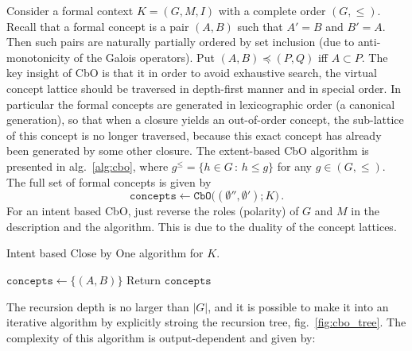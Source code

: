 \documentclass[a4paper,14pt]{extarticle}
\begin{document}
\noindent Consider a formal context $K=(G, M, I)$ with a complete order
$(G, \leq)$. Recall that a formal concept is a pair $(A, B)$ such that $A'=B$ and
$B'=A$. Then such pairs are naturally partially ordered by set inclusion (due to
anti-monotonicity of the Galois operators). Put $(A, B) \preceq (P, Q)$ iff $A\subset P$.
The key insight of CbO is that it in order to avoid exhaustive search, the virtual
concept lattice should be traversed in depth-first manner and in special order. In
particular the formal concepts are generated in lexicographic order (a canonical
generation), so that when a closure yields an out-of-order concept, the sub-lattice
of this concept is no longer traversed, because this exact concept has already been
generated by some other closure. The extent-based CbO algorithm is presented in
alg.~\ref{alg:cbo}, where $g^\leq = \{h\in G\,:\,h\leq g\}$ for any $g\in (G, \leq)$.
The full set of formal concepts is given by
$$ \mathtt{concepts}
    \leftarrow \mathtt{CbO}\bigl((\emptyset'', \emptyset'); K\bigr)
    \,. $$
For an intent based CbO, just reverse the roles (polarity) of $G$ and $M$ in the
description and the algorithm. This is due to the duality of the concept lattices.
\begin{algorithm}
    \caption{Intent based Close by One algorithm for $K$.}\label{alg:cbo}
    \BlankLine
    $\mathtt{concepts} \leftarrow \{(A, B)\}$\;
    Return $\mathtt{concepts}$\;
\end{algorithm}
The recursion depth is no larger than $|G|$, and it is possible to make it into an
iterative algorithm by explicitly stroing the recursion tree, fig.~\ref{fig:cbo_tree}.
The complexity of this algorithm is output-dependent and given by:
\end{document}

